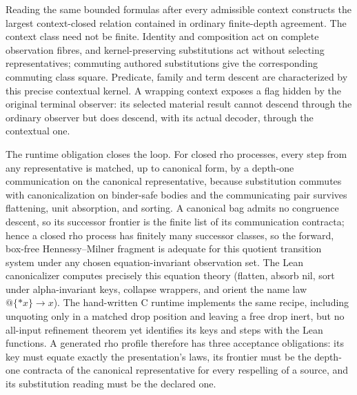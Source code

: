 \documentclass[11pt]{article}
\theoremstyle{definition}
\theoremstyle{remark}
\begin{document}
Reading the same bounded formulas after every admissible context constructs
the largest context-closed relation contained in ordinary finite-depth
agreement.  The context class need not be finite.  Identity and composition
act on complete observation fibres, and kernel-preserving substitutions act
without selecting representatives; commuting authored substitutions give
the corresponding commuting class square.  Predicate, family and term
descent are characterized by this precise contextual kernel.  A wrapping
context exposes a flag hidden by the original terminal observer: its
selected material result cannot descend through the ordinary observer but
does descend, with its actual decoder, through the contextual one.

The runtime obligation closes the loop.  For closed rho processes, every step
from any representative is matched, up to canonical form, by a depth-one
communication on the canonical representative, because substitution commutes
with canonicalization on binder-safe bodies and the communicating pair
survives flattening, unit absorption, and sorting.  A canonical bag admits no
congruence descent, so its successor frontier is the finite list of its
communication contracta; hence a closed rho process has finitely many
successor classes, so the forward, box-free Hennessy--Milner fragment is
adequate for this quotient transition system under any chosen
equation-invariant observation set.  The Lean canonicalizer computes precisely
this equation theory (flatten,
absorb nil, sort under alpha-invariant keys, collapse wrappers, and orient the
name law $@\{{*}x\}\to x$).  The hand-written C runtime implements the same
recipe, including unquoting only in a matched drop position and leaving a free
drop inert, but no all-input refinement theorem yet identifies its keys and
steps with the Lean functions.  A generated rho profile therefore has three
acceptance obligations: its key must equate exactly the presentation's laws,
its frontier must be the depth-one contracta of the canonical representative
for every respelling of a source, and its substitution reading must be the
declared one.
\end{document}
